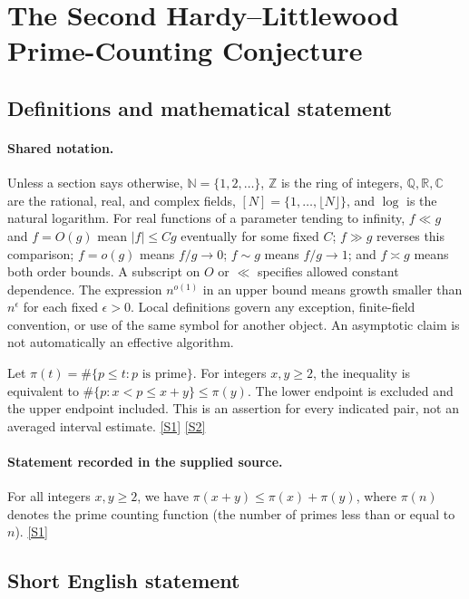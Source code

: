 \documentclass[11pt,a4paper]{article}
\newcommand{\N}{\mathbb{N}}
\newcommand{\Z}{\mathbb{Z}}
\newcommand{\Q}{\mathbb{Q}}
\newcommand{\R}{\mathbb{R}}
\newcommand{\C}{\mathbb{C}}
\newcommand{\sref}[2]{\hyperlink{source:#1:#2}{[S#2]}}
\begin{document}
\section{The Second Hardy--Littlewood Prime-Counting Conjecture}\label{statement}


\subsection{Definitions and mathematical statement}

\paragraph{Shared notation.}Unless a section says otherwise, $\N=\{1,2,\ldots\}$,
$\Z$ is the ring of integers, $\Q,\R,\C$ are the rational, real, and complex
fields, $[N]=\{1,\ldots,\lfloor N\rfloor\}$, and $\log$ is the natural
logarithm. For real functions of a parameter tending to infinity,
$f\ll g$ and $f=O(g)$ mean $|f|\leq Cg$ eventually for some fixed $C$;
$f\gg g$ reverses this comparison; $f=o(g)$ means $f/g\to0$;
$f\sim g$ means $f/g\to1$; and $f\asymp g$ means both order bounds.
A subscript on $O$ or $\ll$ specifies allowed constant dependence.
The expression $n^{o(1)}$ in an upper bound means growth smaller than
$n^\epsilon$ for each fixed $\epsilon>0$. Local definitions govern any
exception, finite-field convention, or use of the same symbol for another
object. An asymptotic claim is not automatically an effective algorithm.



Let $\pi(t)=\#\{p\leq t:p\text{ is prime}\}$. For integers $x,y\geq2$, the inequality is equivalent to $\#\{p:x<p\leq x+y\}\leq\pi(y)$. The lower endpoint is excluded and the upper endpoint included. This is an assertion for every indicated pair, not an averaged interval estimate. \sref{statement}{1} \sref{statement}{2}

\paragraph{Statement recorded in the supplied source.}
For all integers $x, y \geq 2$, we have $\pi(x+y) \leq \pi(x) + \pi(y)$, where $\pi(n)$ denotes the prime counting function (the number of primes less than or equal to $n$). \sref{statement}{1}

\subsection{Short English statement}
\end{document}
